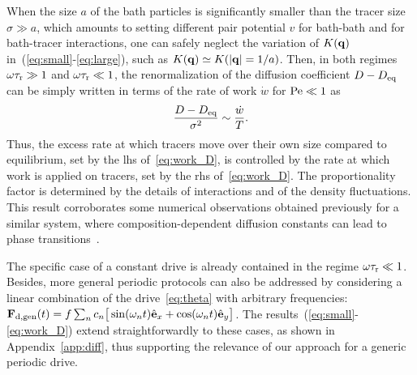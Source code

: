 \documentclass[pre, superscriptaddress, twocolumn,pre]{revtex4-1}
\begin{document}
When the size $a$ of the bath particles is significantly smaller than the tracer size $\sigma\gg a$, which amounts to setting different pair potential $v$ for bath-bath and for bath-tracer interactions, one can safely neglect the variation of $K({\bf q})$ in~(\ref{eq:small}-\ref{eq:large}), such as $K({\bf q}) \simeq K(|{\bf q}|=1/a)$. Then, in both regimes $\omega\tau_{\rm r}\gg 1$ and $\omega\tau_{\rm r}\ll 1$, the renormalization of the diffusion coefficient $D-D_{\rm eq}$ can be simply written in terms of the rate of work $\dot w$ for ${\rm Pe}\ll1$ as
\begin{equation}\label{eq:work_D}
	\frac{D-D_{\rm eq}}{\sigma^2} \sim \frac{\dot w}{T} .
\end{equation}
Thus, the excess rate at which tracers move over their own size compared to equilibrium, set by the lhs of~\eqref{eq:work_D}, is controlled by the rate at which work is applied on tracers, set by the rhs of~\eqref{eq:work_D}. The proportionality factor is determined by the details of interactions and of the density fluctuations. This result corroborates some numerical observations obtained previously for a similar system, where composition-dependent diffusion constants can lead to phase transitions~\cite{delJunco2018}.


The specific case of a constant drive is already contained in the regime $\omega\tau_{\rm r}\ll1$. Besides, more general periodic protocols can also be addressed by considering a linear combination of the drive~\eqref{eq:theta} with arbitrary frequencies: ${\bf F}_{\rm d, gen}(t) = f \sum_n c_n\big[\sin(\omega_n t) \hat{\bf e}_x + \cos(\omega_n t)\hat{\bf e}_y \big]$. The results~(\ref{eq:small}-\ref{eq:work_D}) extend straightforwardly to these cases, as shown in Appendix~\ref{app:diff}, thus supporting the relevance of our approach for a generic periodic drive.
\end{document}
